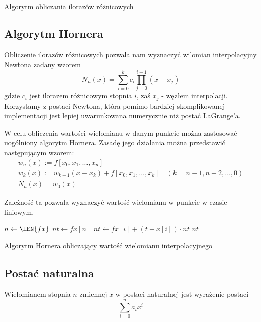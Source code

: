\documentclass{article}
\begin{document}
\begin{algorithm}[h]
\caption{Algorytm obliczania ilorazów różnicowych}
\end{algorithm}

\subsection{Algorytm Hornera}

Obliczenie ilorazów różnicowych pozwala nam wyznaczyć wilomian interpolacyjny Newtona zadany wzorem
$$
N_n(x) = \sum_{i=0}^k c_i \prod_{j=0}^{i-1}(x-x_j)
$$
gdzie $c_i$ jest ilorazem różnicowym stopnia $i$, zaś $x_j$ - węzłem interpolacji.
Korzystamy z postaci Newtona, która pomimo bardziej skomplikowanej implementacji jest lepiej uwarunkowana numerycznie niż postać LaGrange'a.

W celu obliczenia wartości wielomianu w danym punkcie można zastosować uogólniony algorytm Hornera.
Zasadę jego działania można przedstawić następującym wzorem:
$$
\begin{aligned}
	&w_n(x) := f[x_0, x_1, \ldots, x_n]&\\
	&w_k(x) := w_{k+1}(x-x_k)+ f[x_0, x_1, \ldots, x_k]	\quad(k=n-1, n-2, \ldots, 0)&\\
	&N_n(x) = w_0(x)
\end{aligned}
$$

Zależność ta pozwala wyznaczyć wartość wielomianu w punkcie w czasie liniowym.

\begin{algorithm}[h]

 {
  $n \gets \LEN{fx}$\;
  $nt \gets fx[n]$\;
   {
    $nt \gets fx[i] + (t - x[i]) \cdot nt$\; 		
  }
  \KwRet $nt$\;
}
\caption{Algorytm Hornera obliczający wartość wielomianu interpolacyjnego}
\end{algorithm}		

\subsection{Postać naturalna}
Wielomianem stopnia $n$ zmiennej $x$ w postaci naturalnej jest wyrażenie postaci
$$
\sum_{i=0}^{n} a_ix^i
$$
\end{document}
